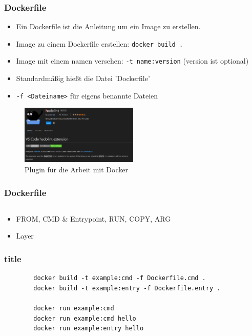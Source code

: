 \documentclass[22pt,handout]{beamer}
\newcommand{\code}[1]{\colorbox{gray!10}{\texttt{#1}}}
\begin{document}
\begin{frame}[fragile]
    \frametitle{Dockerfile}
    \begin{itemize}
        \item Ein Dockerfile ist die Anleitung um ein Image zu erstellen.
        \item Image zu einem Dockerfile erstellen: \code{docker build .}
        \item Image mit einem namen versehen: \code{-t name:version} (version ist optional)
        \item Standardmäßig hießt die Datei 'Dockerfile'
        \item \code{-f <Dateiname>} für eigens benannte Dateien
    \end{itemize}
    
    \begin{figure}[h]
        \centering
        \includegraphics[width=0.5\textwidth]{Bilder/Hadolint.png}
        \caption{Plugin für die Arbeit mit Docker}
    \end{figure}

\end{frame}

\begin{frame}[t]
    \frametitle{Dockerfile}
    \inputminted[fontsize=\footnotesize, frame=lines]{dockerfile}{../examples/Dockerfile}
    \begin{itemize}
        \item FROM, CMD \& Entrypoint, RUN, COPY, ARG
        \item Layer %
    \end{itemize} 
\end{frame}

\begin{frame}[fragile]
    \frametitle{title}
    \begin{verbatim}
        docker build -t example:cmd -f Dockerfile.cmd .
        docker build -t example:entry -f Dockerfile.entry .

        docker run example:cmd
        docker run example:cmd hello
        docker run example:entry hello
    \end{verbatim}
\end{frame}
\end{document}
